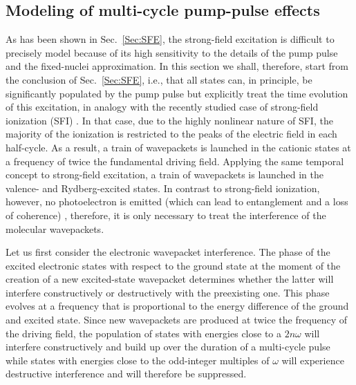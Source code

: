 \documentclass[12pt]{article}
\begin{document}
\subsection{Modeling of multi-cycle pump-pulse effects}

As has been shown in Sec.~\ref{Sec:SFE}, the strong-field excitation is difficult to precisely model because of its high sensitivity to the details of the pump pulse and the fixed-nuclei approximation. In this section we shall, therefore, start from the conclusion of Sec.~\ref{Sec:SFE}, i.e., that all states can, in principle, be significantly populated by the pump pulse but explicitly treat the time evolution of this excitation, in analogy with the recently studied case of strong-field ionization (SFI) \cite{pabst16a}. In that case, due to the highly nonlinear nature of SFI, the majority of the ionization is restricted to the peaks of the electric field in each half-cycle. As a result, a train of wavepackets is launched in the cationic states at a frequency of twice the fundamental driving field. Applying the same temporal concept to strong-field excitation, a train of wavepackets is launched in the valence- and Rydberg-excited states. In contrast to strong-field ionization, however, no photoelectron is emitted (which can lead to entanglement and a loss of coherence) \cite{pabst11a}, therefore, it is only necessary to treat the interference of the molecular wavepackets. 

Let us first consider the electronic wavepacket interference. The phase of the excited electronic states with respect to the ground state at the moment of the creation of a new excited-state wavepacket determines whether the latter will interfere constructively or destructively with the preexisting one. This phase evolves at a frequency that is proportional to the energy difference of the ground and excited state. Since new wavepackets are produced at twice the frequency of the driving field, the population of states with energies close to a $2n\omega$ will interfere constructively and build up over the duration of a multi-cycle pulse while states with energies close to the odd-integer multiples of $\omega$ will experience destructive interference and will therefore be suppressed. 
\end{document}
